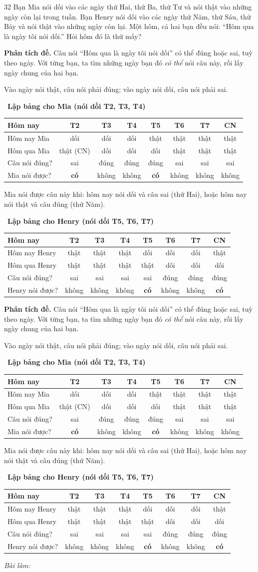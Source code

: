 \documentclass[11pt]{article}
\newif\ifsol \soltrue
\newenvironment{probbox}[2]{\begin{probboxT}{#1}{#2}}{\end{probboxT}}
\newcommand{\StuProb}[2]{\begin{probboxS}{#1}{#2}\StuProbBody\end{probboxS}}
\newcommand{\probsol}[1]{%
  \begin{lrbox}{\solmeasure}\begin{minipage}{\dimexpr\linewidth-24pt\relax}#1\end{minipage}\end{lrbox}%
  \ifsol
    \begin{solbox}#1\end{solbox}%
  \else
    \setlength{\solht}{\dimexpr\ht\solmeasure+\dp\solmeasure+0.85cm\relax}%
    \ifdim\solht<1.35cm\setlength{\solht}{1.35cm}\fi
    \ifdim\solht>\StudentMaxWork\setlength{\solht}{\StudentMaxWork}\fi
    \par\noindent\begin{minipage}{\linewidth}%
    \expandafter\StuProb\StuProbArgs
    \begin{tcolorbox}[colback=white,colframe=Line,boxrule=0.8pt,arc=5pt,
      left=8pt,right=8pt,top=4pt,bottom=4pt,height=\solht]{\footnotesize\color{Slate}\itshape\WorkWord}\end{tcolorbox}%
    \end{minipage}\par\medskip
  \fi}
\newlength{\StudentMaxWork}\setlength{\StudentMaxWork}{4.5cm}
\newcommand{\step}[2]{\par\smallskip\noindent{\bfseries\color{tmBlue!85!black}\StepWord~#1.}\ {\bfseries #2}\par\nopagebreak}
\def\WorkWord{Bài làm:}
\def\StepWord{Bước}
\begin{document}
\begin{probbox}{32}{\relax}
Bạn Mia nói dối vào các ngày thứ Hai, thứ Ba, thứ Tư và nói thật vào những ngày còn lại trong tuần. Bạn Henry nói dối vào các ngày
thứ Năm, thứ Sáu, thứ Bảy và nói thật vào những ngày còn lại. Một hôm, cả hai bạn đều nói: ``Hôm qua là ngày tôi nói dối.''
Hỏi hôm đó là thứ mấy?
\end{probbox}
\probsol{
\textbf{Phân tích đề.} Câu nói ``Hôm qua là ngày tôi nói dối'' có thể đúng hoặc sai, tuỳ theo ngày. Với từng bạn, ta tìm những ngày
bạn đó \emph{có thể} nói câu này, rồi lấy ngày chung của hai bạn.
\begin{recallbox}Vào ngày nói thật, câu nói phải đúng; vào ngày nói dối, câu nói phải sai.\end{recallbox}
\step{1}{Lập bảng cho Mia (nói dối T2, T3, T4)}
\begin{center}\small
\begin{tabular}{|l|c|c|c|c|c|c|c|}
\hline
\rowcolor{tmBlue!10} Hôm nay & T2 & T3 & T4 & T5 & T6 & T7 & CN\\ \hline
Hôm nay Mia & dối & dối & dối & thật & thật & thật & thật\\ \hline
Hôm qua Mia & thật (CN) & dối & dối & dối & thật & thật & thật\\ \hline
Câu nói đúng? & sai & đúng & đúng & đúng & sai & sai & sai\\ \hline
Mia nói được? & \textbf{có} & không & không & \textbf{có} & không & không & không\\ \hline
\end{tabular}
\end{center}
Mia nói được câu này khi: hôm nay nói dối và câu sai (thứ Hai), hoặc hôm nay nói thật và câu đúng (thứ Năm).
\step{2}{Lập bảng cho Henry (nói dối T5, T6, T7)}
\begin{center}\small
\begin{tabular}{|l|c|c|c|c|c|c|c|}
\hline
\rowcolor{tmBlue!10} Hôm nay & T2 & T3 & T4 & T5 & T6 & T7 & CN\\ \hline
Hôm nay Henry & thật & thật & thật & dối & dối & dối & thật\\ \hline
Hôm qua Henry & thật & thật & thật & thật & dối & dối & dối\\ \hline
Câu nói đúng? & sai & sai & sai & sai & đúng & đúng & đúng\\ \hline
Henry nói được? & không & không & không & \textbf{có} & không & không & \textbf{có}\\ \hline

\end{tabular}
\end{center}}
\end{document}
